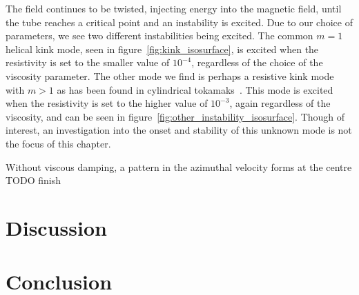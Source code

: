 
The field continues to be twisted, injecting energy into the magnetic field, until the tube reaches a critical point and an instability is excited. Due to our choice of parameters, we see two different instabilities being excited. The common $m=1$ helical kink mode, seen in figure~\ref{fig:kink_isosurface}, is excited when the resistivity is set to the smaller value of $10^{-4}$, regardless of the choice of the viscosity parameter. The other mode we find is perhaps a resistive kink mode with $m>1$ as has been found in cylindrical tokamaks~\cite{furthTearingModeCylindrical1973a}. This mode is excited when the resistivity is set to the higher value of $10^{-3}$, again regardless of the viscosity, and can be seen in figure~\ref{fig:other_instability_isosurface}. Though of interest, an investigation into the onset and stability of this unknown mode is not the focus of this chapter.


Without viscous damping, a pattern in the azimuthal velocity forms at the centre TODO finish


\section{Discussion}

\section{Conclusion}
